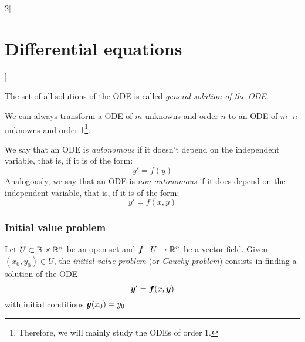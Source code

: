 \documentclass[../../../main.tex]{subfiles}
\begin{document}
\begin{multicols}{2}[\section{Differential equations}]
\begin{definition}
\begin{itemize}
    \end{itemize}
    The set of all solutions of the ODE is called \textit{general solution of the ODE}.
  \end{definition}
  \begin{prop}
    We can always transform a ODE of $m$ unknowns and order $n$ to an ODE of $m\cdot n$ unknowns and order 1\footnote{Therefore, we will mainly study the ODEs of order 1.}.
  \end{prop}
  \begin{definition}
    We say that an ODE is \textit{autonomous} if it doesn't depend on the independent variable, that is, if it is of the form: $$y'=f(y)$$ Analogously, we say that an ODE is \textit{non-autonomous} if it does depend on the independent variable, that is, if it is of the form: $$y'=f(x,y)$$
  \end{definition}
  \subsubsection*{Initial value problem}
  \begin{definition}
    Let $U\subset\mathbb{R}\times\mathbb{R}^n$ be an open set and $\boldsymbol{f}:U\rightarrow\mathbb{R}^n$ be a vector field. Given $(x_0,y_0)\in U$, the \textit{initial value problem} (or \textit{Cauchy problem}) consists in finding a solution of the ODE $$\boldsymbol{y}'=\boldsymbol{f}(x,\boldsymbol{y})$$ with initial conditions $\boldsymbol{y}(x_0)=y_0$.
  \end{definition}
\end{multicols}
\end{document}
